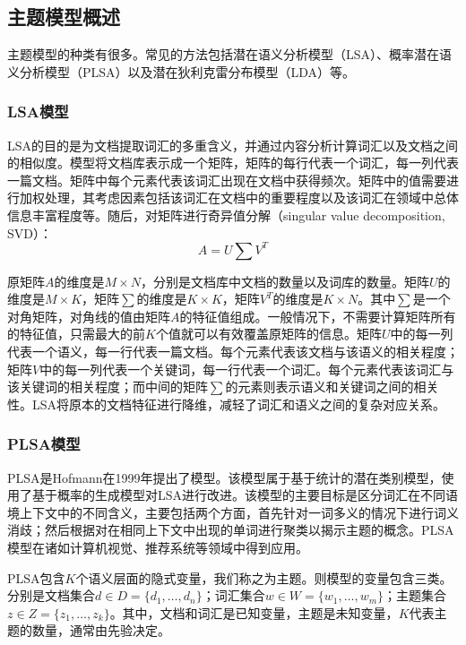 \subsection{主题模型概述}

主题模型的种类有很多。常见的方法包括潜在语义分析模型（LSA）、概率潜在语义分析模型（PLSA）以及潜在狄利克雷分布模型（LDA）等。

\subsubsection{LSA模型}
LSA\parencite{deerwester1990indexing}的目的是为文档提取词汇的多重含义，并通过内容分析计算词汇以及文档之间的相似度。模型将文档库表示成一个矩阵，矩阵的每行代表一个词汇，每一列代表一篇文档。矩阵中每个元素代表该词汇出现在文档中获得频次。矩阵中的值需要进行加权处理，其考虑因素包括该词汇在文档中的重要程度以及该词汇在领域中总体信息丰富程度等。随后，对矩阵进行奇异值分解（singular value decomposition, SVD）\parencite{golub1970singular}：
\begin{equation}
	A = U\sum V^T
\end{equation}

原矩阵$A$的维度是$M \times N$，分别是文档库中文档的数量以及词库的数量。矩阵$U$的维度是$M \times K$，矩阵$\sum$的维度是$K \times K$，矩阵$V^T$的维度是$K \times N$。其中$\sum$是一个对角矩阵，对角线的值由矩阵$A$的特征值组成。一般情况下，不需要计算矩阵所有的特征值，只需最大的前$K$个值就可以有效覆盖原矩阵的信息。矩阵$U$中的每一列代表一个语义，每一行代表一篇文档。每个元素代表该文档与该语义的相关程度；矩阵$V$中的每一列代表一个关键词，每一行代表一个词汇。每个元素代表该词汇与该关键词的相关程度；而中间的矩阵$\sum$的元素则表示语义和关键词之间的相关性。LSA将原本的文档特征进行降维，减轻了词汇和语义之间的复杂对应关系。

\subsubsection{PLSA模型}
PLSA是Hofmann\parencite{hofmann1999probabilistic}在1999年提出了模型。该模型属于基于统计的潜在类别模型，使用了基于概率的生成模型对LSA进行改进。该模型的主要目标是区分词汇在不同语境上下文中的不同含义，主要包括两个方面，首先针对一词多义的情况下进行词义消歧；然后根据对在相同上下文中出现的单词进行聚类以揭示主题的概念。PLSA模型在诸如计算机视觉、推荐系统等领域中得到应用。

PLSA包含$K$个语义层面的隐式变量，我们称之为主题。则模型的变量包含三类。分别是文档集合$d \in D = \{d_1, \dots, d_n\}$；词汇集合$w \in W = \{w_1, \dots, w_m\}$；主题集合$z \in Z = \{z_1, \dots, z_k\}$。其中，文档和词汇是已知变量，主题是未知变量，$K$代表主题的数量，通常由先验决定。

